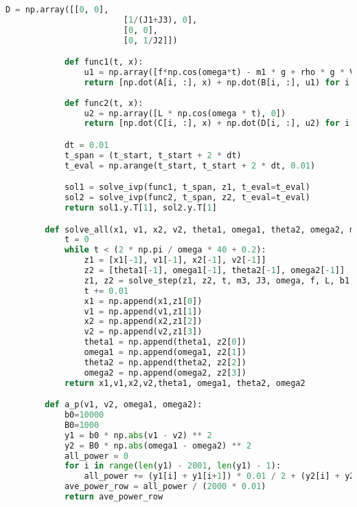 \documentclass[withoutpreface,bwprint]{cumcmthesis} %
\begin{document}
\begin{appendices}
\begin{lstlisting}[language=python]
            D = np.array([[0, 0], 
                        [1/(J1+J3), 0], 
                        [0, 0], 
                        [0, 1/J2]])

            def func1(t, x):
                u1 = np.array([f*np.cos(omega*t) - m1 * g + rho * g * V0 - k * x0, - m2 * g + k * x0])
                return [np.dot(A[i, :], x) + np.dot(B[i, :], u1) for i in range(4)]
            
            def func2(t, x):
                u2 = np.array([L * np.cos(omega * t), 0])
                return [np.dot(C[i, :], x) + np.dot(D[i, :], u2) for i in range(4)]

            dt = 0.01
            t_span = (t_start, t_start + 2 * dt)
            t_eval = np.arange(t_start, t_start + 2 * dt, 0.01)

            sol1 = solve_ivp(func1, t_span, z1, t_eval=t_eval)
            sol2 = solve_ivp(func2, t_span, z2, t_eval=t_eval)
            return sol1.y.T[1], sol2.y.T[1]

        def solve_all(x1, v1, x2, v2, theta1, omega1, theta2, omega2, m3, J3, omega, f, L, b1:float, B1:float, b0:float, B0:float):
            t = 0
            while t < (2 * np.pi / omega * 40 + 0.2):
                z1 = [x1[-1], v1[-1], x2[-1], v2[-1]]
                z2 = [theta1[-1], omega1[-1], theta2[-1], omega2[-1]]
                z1, z2 = solve_step(z1, z2, t, m3, J3, omega, f, L, b1, B1, b0, B0)
                t += 0.01
                x1 = np.append(x1,z1[0])
                v1 = np.append(v1,z1[1])
                x2 = np.append(x2,z1[2])
                v2 = np.append(v2,z1[3])
                theta1 = np.append(theta1, z2[0])
                omega1 = np.append(omega1, z2[1])
                theta2 = np.append(theta2, z2[2])
                omega2 = np.append(omega2, z2[3])
            return x1,v1,x2,v2,theta1, omega1, theta2, omega2

        def a_p(v1, v2, omega1, omega2):
            b0=10000
            B0=1000
            y1 = b0 * np.abs(v1 - v2) ** 2
            y2 = B0 * np.abs(omega1 - omega2) ** 2
            all_power = 0
            for i in range(len(y1) - 2001, len(y1) - 1):
                all_power += (y1[i] + y1[i+1]) * 0.01 / 2 + (y2[i] + y2[i+1]) * 0.01 / 2
            ave_power_row = all_power / (2000 * 0.01)
            return ave_power_row


\end{lstlisting}
\end{appendices}
\end{document}
